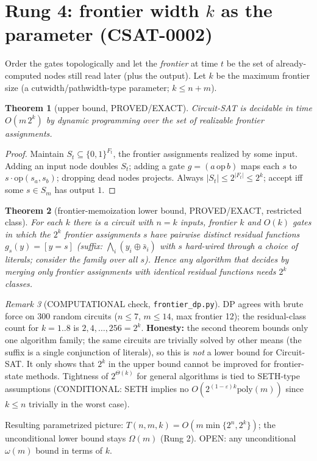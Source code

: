 \documentclass[11pt]{article}
\newtheorem{theorem}{Theorem}\newtheorem{lemma}[theorem]{Lemma}
\theoremstyle{remark}\newtheorem{remark}[theorem]{Remark}
\begin{document}
\section{Rung 4: frontier width $k$ as the parameter (CSAT-0002)}
Order the gates topologically and let the \emph{frontier} at time $t$ be the set of already-computed nodes still read later (plus the output). Let $k$ be the maximum frontier size (a cutwidth/pathwidth-type parameter; $k\le n+m$).
\begin{theorem}[upper bound, PROVED/EXACT] Circuit-SAT is decidable in time $O(m\,2^{k})$ by dynamic programming over the set of realizable frontier assignments.\end{theorem}
\begin{proof} Maintain $S_t\subseteq\{0,1\}^{F_t}$, the frontier assignments realized by some input. Adding an input node doubles $S_t$; adding a gate $g=(a\,\mathrm{op}\,b)$ maps each $s$ to $s\cdot\mathrm{op}(s_a,s_b)$; dropping dead nodes projects. Always $|S_t|\le 2^{|F_t|}\le 2^k$; accept iff some $s\in S_m$ has output $1$.\end{proof}
\begin{theorem}[frontier-memoization lower bound, PROVED/EXACT, restricted class] For each $k$ there is a circuit with $n=k$ inputs, frontier $k$ and $O(k)$ gates in which the $2^k$ frontier assignments $s$ have pairwise distinct residual functions $g_s(y)=[y=s]$ (suffix: $\bigwedge_i(y_i\oplus\bar s_i)$ with $s$ hard-wired through a choice of literals; consider the family over all $s$). Hence any algorithm that decides by merging only frontier assignments with identical residual functions needs $2^k$ classes. \end{theorem}
\begin{remark}[COMPUTATIONAL check, \texttt{frontier\_dp.py}] DP agrees with brute force on 300 random circuits ($n\le7$, $m\le14$, max frontier 12); the residual-class count for $k=1..8$ is $2,4,\dots,256=2^k$. \textbf{Honesty:} the second theorem bounds only one algorithm family; the same circuits are trivially solved by other means (the suffix is a single conjunction of literals), so this is \emph{not} a lower bound for Circuit-SAT. It only shows that $2^{k}$ in the upper bound cannot be improved for frontier-state methods. Tightness of $2^{\Theta(k)}$ for general algorithms is tied to SETH-type assumptions (CONDITIONAL: SETH implies no $O(2^{(1-\varepsilon)k}\mathrm{poly}(m))$ since $k\le n$ trivially in the worst case).\end{remark}
Resulting parametrized picture: $T(n,m,k)=O(m\min\{2^n,2^k\})$; the unconditional lower bound stays $\Omega(m)$ (Rung 2). OPEN: any unconditional $\omega(m)$ bound in terms of $k$.
\end{document}
